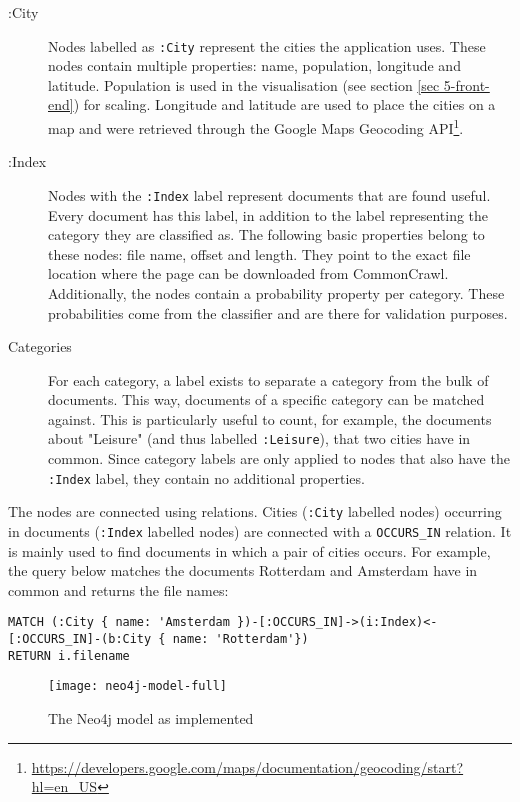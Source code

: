 \begin{description}
\item[:City] Nodes labelled as \texttt{:City} represent the cities the application uses. These nodes contain multiple properties: name, population, longitude and latitude. Population is used in the visualisation (see section \ref{sec 5-front-end}) for scaling. Longitude and latitude are used to place the cities on a map and were retrieved through the Google Maps Geocoding API\footnote{\url{https://developers.google.com/maps/documentation/geocoding/start?hl=en_US}}.
\item[:Index] Nodes with the \texttt{:Index} label represent documents that are found useful. Every document has this label, in addition to the label representing the category they are classified as. The following basic properties belong to these nodes: file name, offset and length. They point to the exact file location where the page can be downloaded from CommonCrawl. Additionally, the nodes contain a probability property per category. These probabilities come from the classifier and are there for validation purposes.
\item[Categories] For each category, a label exists to separate a category from the bulk of documents. This way, documents of a specific category can be matched against. This is particularly useful to count, for example, the documents about "Leisure" (and thus labelled \texttt{:Leisure}), that two cities have in common. Since category labels are only applied to nodes that also have the \texttt{:Index} label, they contain no additional properties.
\end{description}

The nodes are connected using relations. Cities (\texttt{:City} labelled nodes) occurring in documents (\texttt{:Index} labelled nodes) are connected with a \texttt{\:OCCURS_IN} relation. It is mainly used to find documents in which a pair of cities occurs. For example, the query below matches the documents Rotterdam and Amsterdam have in common and returns the file names:

\begin{lstlisting}[language=cypher, caption={Querying documents containing two cities}, label={lst:query-occ}]
MATCH (:City { name: 'Amsterdam })-[:OCCURS_IN]->(i:Index)<-[:OCCURS_IN]-(b:City { name: 'Rotterdam'})
RETURN i.filename
\end{lstlisting}

\begin{figure}
    \centering
    \texttt{[image: neo4j-model-full]}
    \caption{The Neo4j model as implemented}
    \label{fig:my_label}
\end{figure}

